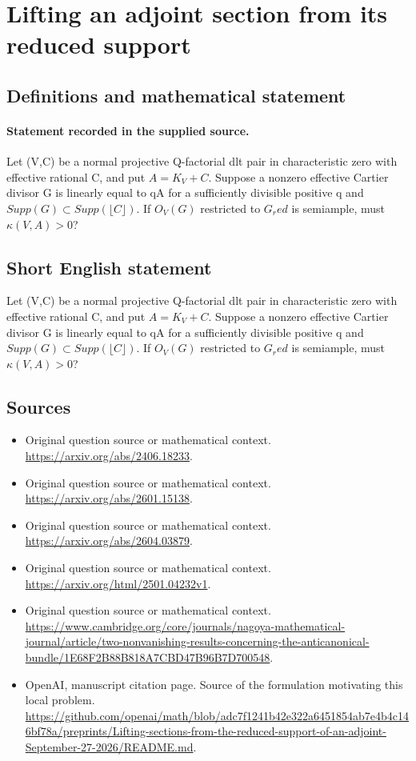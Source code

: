 \documentclass[11pt]{article}
\begin{document}
\section*{Lifting an adjoint section from its reduced support}\label{statement}
\subsection{Definitions and mathematical statement}
\paragraph{Statement recorded in the supplied source.}
Let (V,C) be a normal projective Q-factorial dlt pair in characteristic zero with effective rational C, and put $A=K_V+C$. Suppose a nonzero effective Cartier divisor G is linearly equal to qA for a sufficiently divisible positive q and $Supp(G)\subset Supp(\lfloor C\rfloor )$. If $O_V(G)$ restricted to $G_red$ is semiample, must $\kappa (V,A)>0$?
\subsection{Short English statement}
Let (V,C) be a normal projective Q-factorial dlt pair in characteristic zero with effective rational C, and put $A=K_V+C$. Suppose a nonzero effective Cartier divisor G is linearly equal to qA for a sufficiently divisible positive q and $Supp(G)\subset Supp(\lfloor C\rfloor )$. If $O_V(G)$ restricted to $G_red$ is semiample, must $\kappa (V,A)>0$?
\subsection{Sources}
\begin{itemize}
\item[S1] Original question source or mathematical context.
\url{https://arxiv.org/abs/2406.18233}.
\item[S2] Original question source or mathematical context.
\url{https://arxiv.org/abs/2601.15138}.
\item[S3] Original question source or mathematical context.
\url{https://arxiv.org/abs/2604.03879}.
\item[S4] Original question source or mathematical context.
\url{https://arxiv.org/html/2501.04232v1}.
\item[S5] Original question source or mathematical context.
\url{https://www.cambridge.org/core/journals/nagoya-mathematical-journal/article/two-nonvanishing-results-concerning-the-anticanonical-bundle/1E68F2B88B818A7CBD47B96B7D700548}.
\item[S6] OpenAI, manuscript citation page. Source of the formulation motivating this local problem.
\url{https://github.com/openai/math/blob/adc7f1241b42e322a6451854ab7e4b4c146bf78a/preprints/Lifting-sections-from-the-reduced-support-of-an-adjoint-September-27-2026/README.md}.
\end{itemize}
\end{document}
